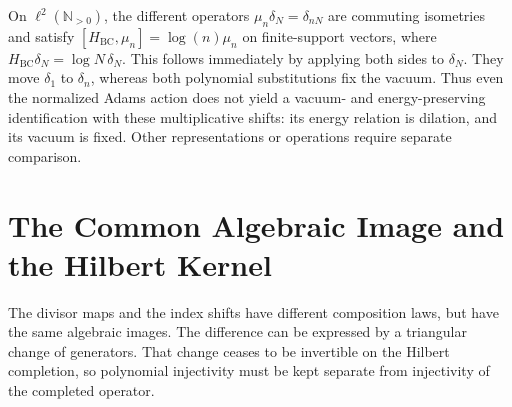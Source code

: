 On \(\ell^2(\mathbb N_{>0})\), the different operators
\(\mu_n\delta_N=\delta_{nN}\) are commuting isometries and satisfy
\([H_{\mathrm{BC}},\mu_n]=\log(n)\mu_n\) on finite-support vectors,
where \(H_{\mathrm{BC}}\delta_N=\log N\,\delta_N\).
This follows immediately by applying both sides to \(\delta_N\).
They move \(\delta_1\) to \(\delta_n\), whereas both polynomial
substitutions fix the vacuum. Thus even the normalized Adams action
does not yield a vacuum- and energy-preserving identification with these
multiplicative shifts: its energy relation is dilation, and its vacuum
is fixed. Other representations or operations require separate comparison.


\section{The Common Algebraic Image and the Hilbert Kernel}
\label{v4-arith:ado:triangular-hilbert}

The divisor maps and the index shifts have different composition laws,
but have the same algebraic images. The difference can be expressed by
a triangular change of generators. That change ceases to be invertible
on the Hilbert completion, so polynomial injectivity must be kept
separate from injectivity of the completed operator.

